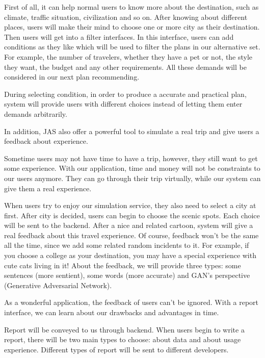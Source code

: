 \documentclass[10pt]{article}
\begin{document}
First of all, it can help normal users to know more about the destination, such as climate, traffic situation, civilization and so on. After knowing about different places, users will make their mind to choose one or more city as their destination. Then users will get into a filter interfaces. In this interface, users can add conditions as they like which will be used to filter the plans in our alternative set. For example, the number of travelers, whether they have a pet or not, the style they want, the budget and any other requirements. All these demands will be considered in our next plan recommending.

During selecting condition, in order to produce a accurate and practical plan, system will provide users with different choices instead of letting them enter demands arbitrarily.

In addition, JAS also offer a powerful tool to simulate a real trip and give users a feedback about experience.

Sometime users may not have time to have a trip, however, they still want to get some experience. With our application, time and money will not be constraints to our users anymore.
They can go through their trip virtually, while our system can give them a real experience.

When users try to enjoy our simulation service, they also need to select a city at first. After city is decided, users can begin to choose the scenic spots. Each choice will be sent to the backend. After a nice and related cartoon, system will give a real feedback about this travel experience. Of course, feedback won’t be the same all the time, since we add some related random incidents to it. For example, if you choose a college as your destination, you may have a special experience with cute cats living in it! About the feedback, we will provide three types: some sentences (more sentient), some words (more accurate) and GAN’s perspective (Generative Adversarial Network). 

As a wonderful application, the feedback of users can’t be ignored. With a report interface, we can learn about our drawbacks and advantages in time.

Report will be conveyed to us through backend. When users begin to write a report, there will be two main types to choose: about data and about usage experience. Different types of report will be sent to different developers. 
\end{document}
